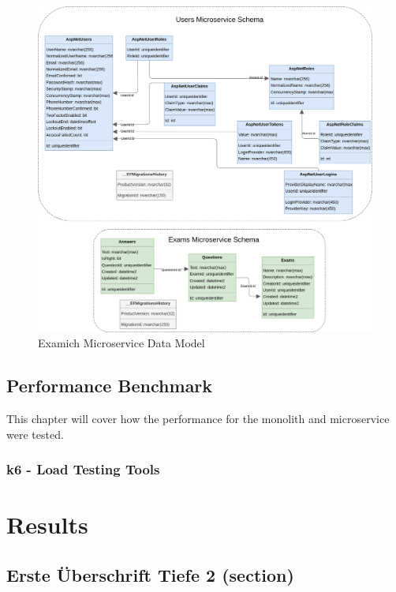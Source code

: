 \documentclass[BIF,Master,nenglish]{twbook}%
\begin{document}
\begin{figure} [H]
 \begin{center}
    \includegraphics[width=1\linewidth]{img/ExamichMicroserviceDataModel.png}
 \end{center}
 \caption{Examich Microservice Data Model}
 \label{datamodelmicroservice}
\end{figure}




\section{Performance Benchmark}
This chapter will cover how the performance for the  monolith and microservice were tested.  

\subsection{k6 - Load Testing Tools}


\chapter{Results}

\section{Erste Überschrift Tiefe 2 (section)}
\end{document}
